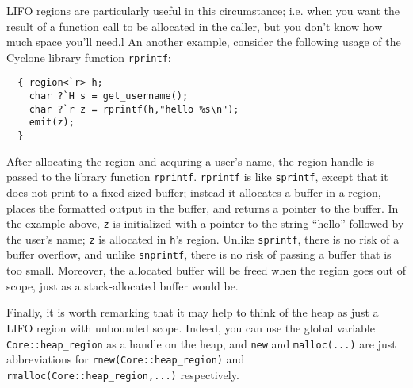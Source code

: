 LIFO regions are particularly useful in this circumstance; i.e. when
you want the result of a function call to be allocated in the caller,
but you don't know how much space you'll need.l An another example,
consider the following usage of the Cyclone library function
\texttt{rprintf}:
\begin{verbatim}
  { region<`r> h;
    char ?`H s = get_username();
    char ?`r z = rprintf(h,"hello %s\n");
    emit(z);
  }
\end{verbatim}
After allocating the region and acquring a user's name, the region
handle is passed to the library function \texttt{rprintf}.
\texttt{rprintf} is like \texttt{sprintf}, except that it does not
print to a fixed-sized buffer; instead it allocates a buffer in a
region, places the formatted output in the buffer, and returns a
pointer to the buffer.  In the example above, \texttt{z} is
initialized with a pointer to the string ``hello'' followed by the
user's name; \texttt{z} is allocated in \texttt{h}'s region.  Unlike
\texttt{sprintf}, there is no risk of a buffer overflow, and unlike
\texttt{snprintf}, there is no risk of passing a buffer that is too
small.  Moreover, the allocated buffer will be freed when the region
goes out of scope, just as a stack-allocated buffer would be.

Finally, it is worth remarking that it may help to think of the heap
as just a LIFO region with unbounded scope.  Indeed, you can use the
global variable \texttt{Core::heap_region} as a handle on the heap,
and \texttt{new} and \texttt{malloc(...)}  are just abbreviations for
\texttt{rnew(Core::heap_region)} and
\texttt{rmalloc(Core::heap_region,...)} respectively.




